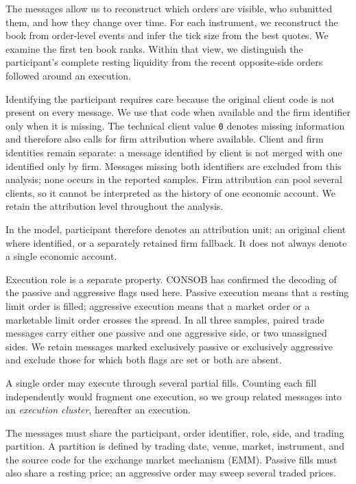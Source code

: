 \documentclass[11pt]{article}
\begin{document}
The messages allow us to reconstruct which orders are visible, who submitted them, and how they change over time.
For each instrument, we reconstruct the book from order-level events and infer the tick size from the best quotes.
We examine the first ten book ranks. Within that view, we distinguish the participant's complete resting liquidity
from the recent opposite-side orders followed around an execution.

Identifying the participant requires care because the original client code is not present on every message.
We use that code when available and the firm identifier only when it is missing. The technical client value
\texttt{0} denotes missing information and therefore also calls for firm attribution where available.
Client and firm identities remain separate: a message identified by client is not merged with one identified only by
firm. Messages missing both identifiers are excluded from this analysis; none occurs in the reported samples.
Firm attribution can pool several clients, so it cannot be interpreted as the history of one economic account.
We retain the attribution level throughout the analysis.

In the model, participant therefore denotes an attribution unit: an original client where identified, or a separately retained firm fallback. It does not always denote a single economic account.

Execution role is a separate property. CONSOB has confirmed the decoding of the passive and aggressive flags used here.
Passive execution means that a resting limit order is filled; aggressive execution means that a market order or a
marketable limit order crosses the spread. In all three samples, paired trade messages carry either one passive and one
aggressive side, or two unassigned sides. We retain messages marked exclusively passive or exclusively aggressive and
exclude those for which both flags are set or both are absent.

A single order may execute through several partial fills. Counting each fill independently would fragment one execution, so we group related messages into an \emph{execution cluster}, hereafter an execution.

The messages must share the participant, order identifier, role, side, and trading partition. A partition is defined by trading date, venue, market, instrument, and the source code for the exchange market mechanism (EMM). Passive fills must also share a resting price; an aggressive order may sweep several traded prices.
\end{document}

